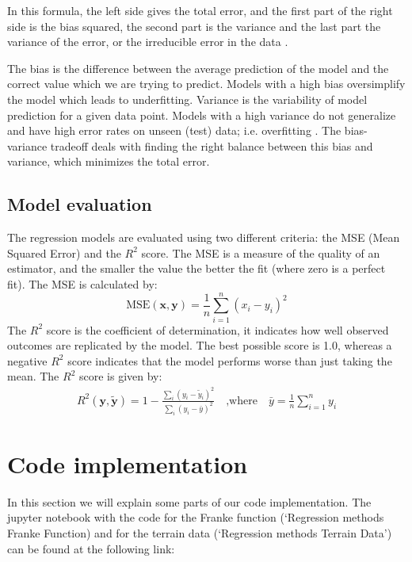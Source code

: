 \documentclass[12pt]{extarticle}
\begin{document}
In this formula, the left side gives the total error, and the first part of the right side is the bias squared, the second part is the variance and the last part the variance of the error, or the irreducible error in the data \cite{elemstat}.

The bias is the difference between the average prediction of the model and the correct value which we are trying to predict. Models with a high bias oversimplify the model which leads to underfitting. Variance is the variability of model prediction for a given data point. Models with a high variance do not generalize and have high error rates on unseen (test) data; i.e. overfitting \cite{elemstat}. The bias-variance tradeoff deals with finding the right balance between this bias and variance, which minimizes the total error.


\subsection{Model evaluation}

The regression models are evaluated using two different criteria: the MSE (Mean Squared Error) and the $R^2$ score. 
The MSE is a measure of the quality of an estimator, and the smaller the value the better the fit (where zero is a perfect fit). The MSE is calculated by: 
\begin{equation*}
  \textrm{MSE}(\bm{x}, \bm{y}) = \frac{1}{n} \sum_{i=1}^n (x_i - y_i)^2
\end{equation*}
The $R^2$ score is the coefficient of determination, it indicates how well observed outcomes are replicated by the model. The best possible score is 1.0, whereas a negative $R^2$ score indicates that the model performs worse than just taking the mean. The $R^2$ score is given by:
\begin{equation*}
\begin{aligned}
   R^2(\bm{y}, \bm{\tilde{y}}) = 1 - \frac{\sum_i (y_i - \tilde{y}_i)^2}{\sum_i (y_i - \bar{y})^2} \quad \textrm{,where} \quad \bar{y} = \frac{1}{n} \sum_{i=1}^n y_i
\end{aligned}
\end{equation*}

\section{Code implementation}

In this section we will explain some parts of our code implementation. The jupyter notebook with the code for the Franke function (‘Regression methods Franke Function) and for the terrain data (‘Regression methods Terrain Data’) can be found at the following link: 
\end{document}
